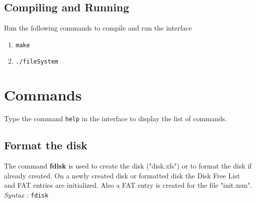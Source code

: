 \documentclass[11pt]{report}
\begin{document}
\subsection{Compiling and Running}
Run the following commands to compile and run the interface
\begin{enumerate}
		\item \texttt{make}
		\item \texttt{./fileSystem}
\end{enumerate}

\section{Commands}
Type the command \texttt{help} in the interface to display the list of commands.

 
\subsection{Format the disk}
The command \textbf{fdisk} is used to create the disk ("disk.xfs") or to format the disk if already created. On a newly created disk or formatted disk the Disk Free List and FAT entries are initialized. Also a FAT entry is created for the file "init.xsm". \\
\textit{Syntax} : \texttt{fdisk}
\end{document}
